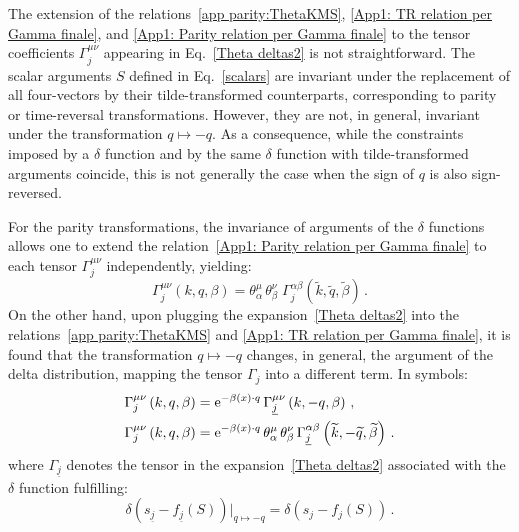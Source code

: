 \documentclass[prd,superscriptaddress,nofootinbib,notitlepage]{revtex4-1}
\newcommand{\e}{{\rm e}}
\begin{document}
%
The extension of the relations~\eqref{app parity:ThetaKMS}, \eqref{App1: TR relation per Gamma finale}, 
and \eqref{App1: Parity relation per Gamma finale} to the tensor coefficients $\Gamma^{\mu\nu}_j$ appearing 
in Eq.~\eqref{Theta deltas2} is not straightforward. The scalar arguments $S$ defined in Eq.~\eqref{scalars} 
are invariant under the replacement of all four-vectors by their tilde-transformed counterparts, corresponding 
to parity or time-reversal transformations. However, they are not, in general, invariant under the transformation 
$q \mapsto -q$. As a consequence, while the constraints imposed by a $\delta$ function and by the same $\delta$ 
function with tilde-transformed arguments coincide, this is not generally the case when the sign of $q$ is 
also sign-reversed.

For the parity transformations, the invariance of arguments of the $\delta$ functions allows one to extend the 
relation~\eqref{App1: Parity relation per Gamma finale} to each tensor $\Gamma^{\mu\nu}_j$ independently, yielding:
%
\begin{equation*}
    \Gamma^{\mu\nu}_{j}\left(k,q,\beta\right) =
    \theta^\mu_{\alpha}\,\theta^\nu_{\beta}\;
    \Gamma^{\alpha\beta}_{j}\left(\widetilde{k},\widetilde{q},\widetilde{\beta}\right)\, .
\end{equation*}
%
On the other hand, upon plugging the expansion~\eqref{Theta deltas2} into the relations~\eqref{app parity:ThetaKMS} and 
\eqref{App1: TR relation per Gamma finale}, it is found that the transformation $q \mapsto -q$ changes, in general, the argument of the delta distribution, mapping the tensor $\Gamma_j$ into a different term. In symbols:
%
\begin{equation*}
    \begin{split}
        \Gamma^{\mu\nu}_j\left(k,q,\beta\right)
        &= \e^{-\beta(x)\cdot q}\,
        \Gamma^{\mu\nu}_{\underline{j}}\left(k,-q,\beta\right)\, , \\
        \Gamma^{\mu\nu}_j\left(k,q,\beta\right)
        &= \e^{-\beta(x)\cdot q}\,
        \theta^\mu_{\alpha}\,\theta^\nu_{\beta}\,
        \Gamma^{\alpha\beta}_{\underline{j}}\left(\widetilde{k},-\widetilde{q},\widetilde{\beta}\right)\, .
    \end{split}
\end{equation*}
%
where $\Gamma_{\underline{j}}$ denotes the tensor in the expansion~\eqref{Theta deltas2} associated with the $\delta$ function fulfilling:
%
\begin{equation*}
    \delta\!\left(s_{\underline{j}} - f_{\underline{j}}(S)\right)\Big|_{q \mapsto -q}
    =\delta\!\left(s_j - f_j(S)\right)\, .
\end{equation*}
\end{document}
